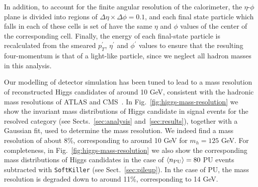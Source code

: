 In addition, to account for the finite angular resolution of the calorimeter,
the $\eta$-$\phi$ plane is divided into regions of
$\Delta \eta \times \Delta \phi=0.1$, and each final state particle
which falls in each of these cells is set of have the same $\eta$
and $\phi$ values of the center of the
corresponding cell.
%
Finally, the  energy
of each final-state particle
is recalculated from the smeared $p_T^\prime$,
$\eta^\prime$ and $\phi^\prime$ values to ensure that the resulting
four-momentum is that of a light-like particle, since we neglect all
hadron masses in this analysis.


Our modelling of detector simulation has been tuned
to lead to a mass resolution of
reconstructed Higgs candidates of around 10 GeV, consistent
with the hadronic mass resolutions of ATLAS and CMS~\cite{Aad:2012gxa,Chatrchyan:2013zna,Aad:2014xzb}.
%
In Fig.~\ref{fig:higgs-mass-resolution} we show the
invariant mass distributions of 
Higgs candidate in signal events for the
resolved category (see Sects.~\ref{sec:analysis}
and~\ref{sec:results}), together with
a Gaussian fit,
used to determine the mass resolution.
%
We indeed  find a mass resolution of about 8\%, corresponding
    to around 10 GeV for $m_h=125$ GeV.
%
    For completeness, in Fig.~\ref{fig:higgs-mass-resolution}
    we also show the corresponding
    mass distributions of Higgs candidates
    in the case of $\left\langle n_{\rm PU}\right\rangle=80$ PU events
    subtracted with {\tt SoftKiller} (see Sect.~\ref{sec:pileup}).
    In the case of PU, the mass resolution is degraded down to
    around 11\%, corresponding to 
    14 GeV.
        
